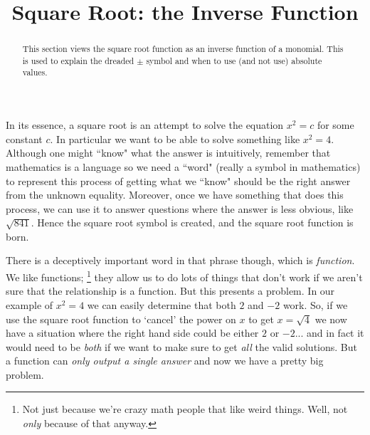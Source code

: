 \documentclass{ximeraXloud}
\title{Square Root: the Inverse Function}
\begin{document}
\begin{abstract}
This section views the square root function as an inverse function of a monomial. This is used to explain the dreaded $\pm$ symbol and when to use (and not use) absolute values.
\end{abstract}
\maketitle

In its essence, a square root is an attempt to solve the equation $x^2 = c$ for some constant $c$. In particular we want to be able to solve something like $x^2 = 4$. Although one might ``know" what the answer is intuitively, remember that mathematics is a language so we need a ``word" (really a symbol in mathematics) to represent this process of getting what we ``know" should be the right answer from the unknown equality. Moreover, once we have something that does this process, we can use it to answer questions where the answer is less obvious, like $\sqrt{841}$. Hence the square root symbol is created, and the square root function is born.

There is a deceptively important word in that phrase though, which is \textit{function}. We like functions;%
\footnote{%
    Not just because we're crazy math people that like weird things. Well, not \textit{only} because of that anyway.%
}%
they allow us to do lots of things that don't work if we aren't sure that the relationship is a function. But this presents a problem. In our example of $x^2 = 4$ we can easily determine that both $2$ and $-2$ work. So, if we use the square root function to `cancel' the power on $x$ to get $x = \sqrt{4}$ we now have a situation where the right hand side could be either $2$ or $-2$... and in fact it would need to be \textit{both} if we want to make sure to get \textit{all} the valid solutions. But a function can \textit{only output a single answer} and now we have a pretty big problem.
\end{document}
